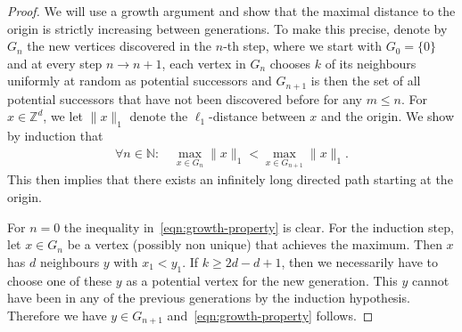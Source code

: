 \documentclass{article}
\newcommand{\N}{\mathbb{N}}
\theoremstyle{definition}
\newcommand{\1}{\mathbbm{1}}
\newcommand{\0}{\mathbf{o}}
\newcommand{\Z}{\mathbb{Z}}
\begin{document}
\begin{proof}
    We will use a growth argument and show that the maximal distance to the origin is strictly increasing between generations. To make this precise, denote by $G_n$ the new vertices discovered in the $n$-th step, where we start with $G_0 = \{0\}$ and at every step $n \to n+1$, each vertex in $G_n$ chooses $k$ of its neighbours uniformly at random as potential successors and $G_{n+1}$ is then the set of all potential successors that have not been discovered before for any $m  \leq n$. For $x\in\Z^d$, we let $\|x\|_1$ denote the $\ell_1$-distance between $x$ and the origin. We show by induction that 
    \begin{align}\label{eqn:growth-property}
         \forall n  \in \N:   \quad \max_{x \in G_n}\|x\|_1 < \max_{x \in G_{n+1}}\|x\|_1.  
    \end{align}
    This then implies that there exists an infinitely long directed path starting at the origin. 
    
    For $n=0$ the inequality in~\eqref{eqn:growth-property} is clear. For the induction step, let $x \in G_n$ be a vertex (possibly non unique) that achieves the maximum. Then $x$ has $d$ neighbours $y$ with $x_1 < y_1$. If $k  \geq 2d-d+1$, then we necessarily have to choose one of these $y$ as a potential vertex for the new generation. This $y$ cannot have been in any of the previous generations by the induction hypothesis. Therefore we have $y \in G_{n+1}$ and~\eqref{eqn:growth-property} follows. 
    \end{proof}
\end{document}

